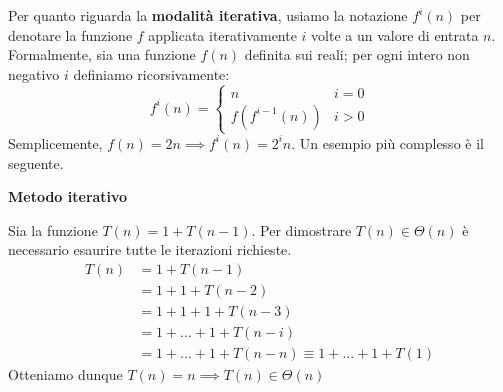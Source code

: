 \noindent Per quanto riguarda la \textbf{modalità iterativa}, usiamo la notazione $f^i(n)$ per denotare la funzione $f$ applicata iterativamente $i$ volte a un valore di entrata $n$. Formalmente, sia una funzione $f(n)$ definita sui reali; per ogni intero non negativo $i$ definiamo ricorsivamente: \[f^i(n) = \begin{cases}
	n & i=0\\
	f(f^{i-1}(n)) & i>0
\end{cases}\]
\noindent Semplicemente, $f(n) = 2n \implies f^i(n) = 2^in$. Un esempio più complesso è il seguente.
\begin{esempio}
	\textbf{Metodo iterativo}\par
	\noindent Sia la funzione $T(n) = 1+T(n-1)$. Per dimostrare $T(n)\in \Theta(n)$ è necessario esaurire tutte le iterazioni richieste.
	\begin{equation}
		\begin{split}
			T(n) &= 1+T(n-1)\\
				&= 1+1+T(n-2)\\
				&= 1+1+1+T(n-3)\\
				&= 1+...+1+T(n-i)\\
				&= 1+...+1+T(n-n) \equiv 1+...+1+T(1)
		\end{split}
	\end{equation}
	\noindent Otteniamo dunque $T(n) = n \implies T(n) \in \Theta(n)$
\end{esempio}

%


